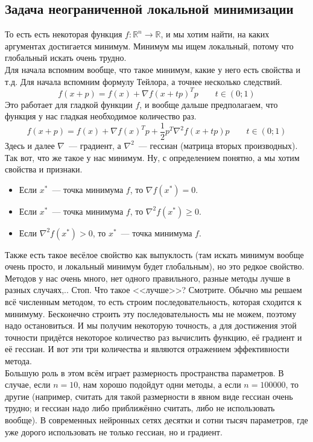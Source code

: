 \documentclass{article}
\begin{document}
    \subsection{Задача неограниченной локальной минимизации}
    То есть есть некоторая функция $f\colon\mathbb R^n\to\mathbb R$, и мы хотим найти, на каких аргументах достигается минимум. Минимум мы ищем локальный, потому что глобальный искать очень трудно.\\
    Для начала вспомним вообще, что такое минимум, какие у него есть свойства и т.д. Для начала вспомним формулу Тейлора, а точнее несколько следствий.
    $$
    f(x+p)=f(x)+\nabla f(x+tp)^Tp\qquad t\in (0;1)
    $$
    Это работает для гладкой функции $f$, и вообще дальше предполагаем, что функция у нас гладкая необходимое количество раз.
    $$
    f(x+p)=f(x)+\nabla f(x)^Tp+\frac12p^T\nabla^2f(x+tp)p\qquad t\in(0;1)
    $$
    Здесь и далее $\nabla$~--- градиент, а $\nabla^2$~--- гессиан (матрица вторых производных).\\
    Так вот, что же такое у нас минимум. Ну, с определением понятно, а мы хотим свойства и признаки.
    \begin{itemize}
        \item Если $x^*$~--- точка минимума $f$, то $\nabla f(x^*)=0$.
        \item Если $x^*$~--- точка минимума $f$, то $\nabla^2 f(x^*)\geqslant0$.
        \item Если $\nabla^2 f(x^*)>0$, то $x^*$~--- точка минимума $f$.
    \end{itemize}
    Также есть такое весёлое свойство как выпуклость (там искать минимум вообще очень просто, и локальный минимум будет глобальным), но это редкое свойство.\\
    Методов у нас очень много, нет одного правильного, разные методы лучше в разных случаях,.. Стоп. Что такое <<лучше>>? Смотрите. Обычно мы решаем всё численным методом, то есть строим последовательность, которая сходится к минимуму. Бесконечно строить эту последовательность мы не можем, поэтому надо остановиться. И мы получим некоторую точность, а для достижения этой точности придётся некоторое количество раз вычислить функцию, её градиент и её гессиан. И вот эти три количества и являются отражением эффективности метода.\\
    Большую роль в этом всём играет размерность пространства параметров. В случае, если $n=10$, нам хорошо подойдут одни методы, а если $n=100000$, то другие (например, считать для такой размерности в явном виде гессиан очень трудно; и гессиан надо либо приближённо считать, либо не использовать вообще). В современных нейронных сетях десятки и сотни тысяч параметров, где уже дорого использовать не только гессиан, но и градиент.
\end{document}
